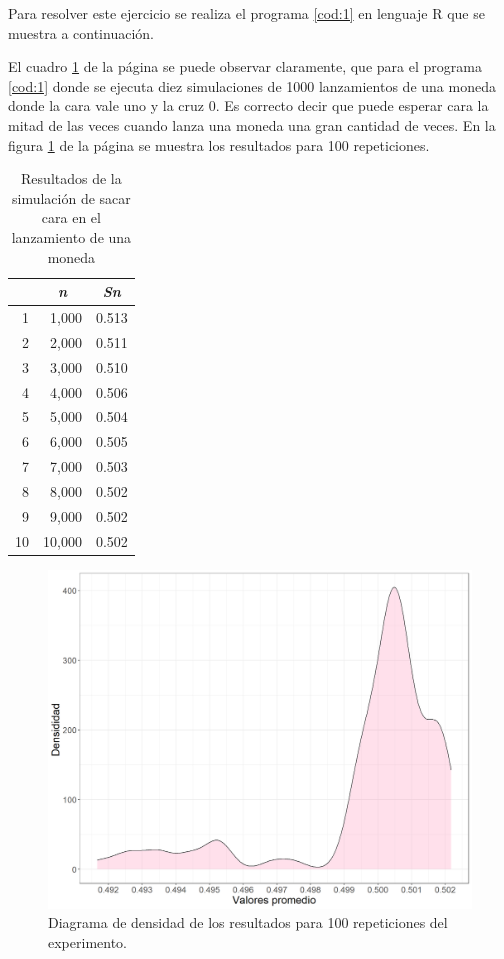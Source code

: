 \documentclass{article}
\begin{document}
Para resolver este ejercicio se realiza el programa \ref{cod:1} en lenguaje R \cite{R} que se muestra a continuación.

\begin{center}

\label{cod:1}
\end{center}
 El cuadro \ref{tab:1} de la página \pageref{tab:1} se puede observar claramente, que para el programa \ref{cod:1} donde se ejecuta diez simulaciones de 1000 lanzamientos de una moneda donde la cara vale uno y la cruz 0. Es correcto decir que puede esperar cara la mitad de las veces cuando lanza una moneda una gran cantidad de veces. En la figura \ref{fig:1} de la página \pageref{fig:1} se muestra los resultados para 100 repeticiones.

\begin{table}[H]
  \centering
  \caption{Resultados de la simulación de sacar cara en el lanzamiento de una moneda}
  \vspace{0.1cm}
    \begin{tabular}{rrr}
    \toprule
          & \multicolumn{1}{c}{\textit{\textbf{n}}} & \multicolumn{1}{c}{\textit{\textbf{Sn}}} \\
    \midrule
    1     & 1,000 & 0.513 \\
    2     & 2,000 & 0.511 \\
    3     & 3,000 & 0.510 \\
    4     & 4,000 & 0.506 \\
    5     & 5,000 & 0.504 \\
    6     & 6,000 & 0.505 \\
    7     & 7,000 & 0.503 \\
    8     & 8,000 & 0.502 \\
    9     & 9,000 & 0.502 \\
    10    & 10,000 & 0.502 \\
    \bottomrule
    \end{tabular}%
  \label{tab:1}%
\end{table}%
\begin{figure}
    \centering
    \includegraphics[scale=0.35]{figuras/ejercicio13.png}
    \caption{Diagrama de densidad de los resultados para 100 repeticiones del experimento.}
    \label{fig:1}
\end{figure}
\end{document}
